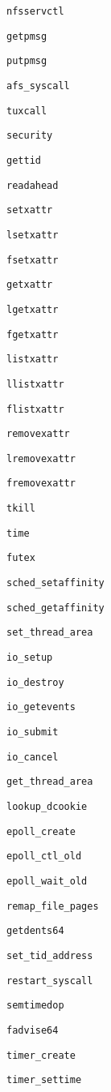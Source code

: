 \verb+nfsservctl+

\verb+getpmsg+

\verb+putpmsg+

\verb+afs_syscall+

\verb+tuxcall+

\verb+security+

\verb+gettid+

\verb+readahead+

\verb+setxattr+

\verb+lsetxattr+

\verb+fsetxattr+

\verb+getxattr+

\verb+lgetxattr+

\verb+fgetxattr+

\verb+listxattr+

\verb+llistxattr+

\verb+flistxattr+

\verb+removexattr+

\verb+lremovexattr+

\verb+fremovexattr+

\verb+tkill+

\verb+time+

\verb+futex+

\verb+sched_setaffinity+

\verb+sched_getaffinity+

\verb+set_thread_area+

\verb+io_setup+

\verb+io_destroy+

\verb+io_getevents+

\verb+io_submit+

\verb+io_cancel+

\verb+get_thread_area+

\verb+lookup_dcookie+

\verb+epoll_create+

\verb+epoll_ctl_old+

\verb+epoll_wait_old+

\verb+remap_file_pages+

\verb+getdents64+

\verb+set_tid_address+

\verb+restart_syscall+

\verb+semtimedop+

\verb+fadvise64+

\verb+timer_create+

\verb+timer_settime+

